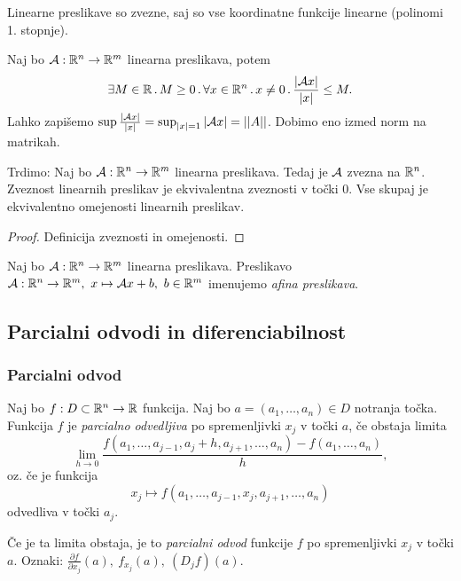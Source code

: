 \begin{opomba}
    Linearne preslikave so zvezne, saj so vse koordinatne funkcije linearne (polinomi 1. stopnje).
\end{opomba}

\begin{zgled}
    Naj bo $\mathcal{A}: \mathbb{R}^n \to \mathbb{R}^m$ linearna preslikava, potem $$\exists  M \in \mathbb{R} \, . \, M \geq 0 \,.\, \forall x \in \mathbb{R}^n \, . \, x \neq 0  \,.\,  \frac{|\mathcal{A}x|}{|x|} \leq M.$$
    Lahko zapišemo $\sup \frac{|\mathcal{A}x|}{|x|} = \sup_{|x|=1}|\mathcal{A}x| = ||A||$. Dobimo eno izmed norm na matrikah.

    Trdimo: Naj bo $\mathcal{A}: \mathbb{R}^n \to \mathbb{R}^m$ linearna preslikava. Tedaj je $\mathcal{A}$ zvezna na $\mathbb{R}^n$. Zveznost linearnih preslikav je ekvivalentna zveznosti v točki $0$. Vse skupaj je ekvivalentno omejenosti linearnih preslikav.
\end{zgled}

\begin{proof}
    Definicija zveznosti in omejenosti.
\end{proof}

\begin{definicija}
    Naj bo $\mathcal{A}: \mathbb{R}^n \to \mathbb{R}^m$ linearna preslikava. Preslikavo $\mathcal{A}: \mathbb{R}^n \to \mathbb{R}^m, \ x \mapsto \mathcal{A}x + b, \ b \in \mathbb{R}^m$ imenujemo \emph{afina preslikava}.
\end{definicija}

\subsection{Parcialni odvodi in diferenciabilnost}
\subsubsection{Parcialni odvod}
\begin{definicija}
    Naj bo $f: D \subset \mathbb{R}^n \to \mathbb{R}$ funkcija. Naj bo $a = (a_1, \ldots, a_n) \in D$ notranja točka. Funkcija $f$ je \emph{parcialno odvedljiva} po spremenljivki $x_j$ v točki $a$, če obstaja limita 
    $$\lim_{h \to 0} \frac{f(a_1, \ldots, a_{j-1}, a_j+h, a_{j+1}, \ldots, a_n) - f(a_1, \ldots, a_n)}{h},$$
    oz. če je funkcija 
    $$x_j \mapsto f(a_1, \ldots, a_{j-1}, x_j, a_{j+1}, \ldots, a_n)$$
    odvedliva v točki $a_j$.

    Če je ta limita obstaja, je to \emph{parcialni odvod} funkcije $f$ po spremenljivki $x_j$ v točki $a$.
    Oznaki: $\frac{\partial f}{\partial x_j}(a), \ f_{x_j}(a), \ (D_jf)(a)$.
\end{definicija}

